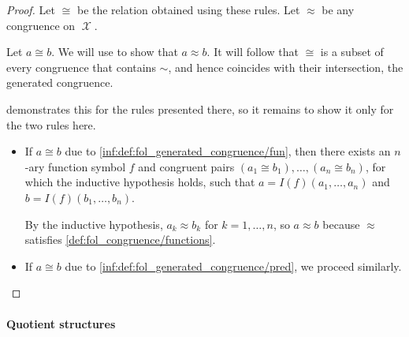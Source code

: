 \begin{proof}
  Let \( {\cong} \) be the relation obtained using these rules. Let \( {\approx} \) be any congruence on \( \mscrX \).

  Let \( a \cong b \). We will use  to show that \( a \approx b \). It will follow that \( {\cong} \) is a subset of every congruence that contains \( {\sim} \), and hence coincides with their intersection, the generated congruence.

   demonstrates this for the rules presented there, so it remains to show it only for the two rules here.
  \begin{itemize}
    \item If \( a \cong b \) due to \ref{inf:def:fol_generated_congruence/fun}, then there exists an \( n \)-ary function symbol \( f \) and congruent pairs \( (a_1 \cong b_1), \ldots, (a_n \cong b_n) \), for which the inductive hypothesis holds, such that \( a = I(f)(a_1, \ldots, a_n) \) and \( b = I(f)(b_1, \ldots, b_n) \).

    By the inductive hypothesis, \( a_k \approx b_k \) for \( k = 1, \ldots, n \), so \( a \approx b \) because \( {\approx} \) satisfies \cref{def:fol_congruence/functions}.

    \item If \( a \cong b \) due to \ref{inf:def:fol_generated_congruence/pred}, we proceed similarly.
  \end{itemize}
\end{proof}

\paragraph{Quotient structures}

